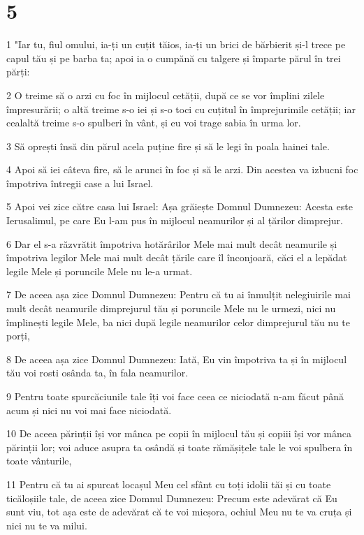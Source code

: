\chapter{5}

\par 1 "Iar tu, fiul omului, ia-ți un cuțit tăios, ia-ți un brici de bărbierit și-l trece pe capul tău și pe barba ta; apoi ia o cumpănă cu talgere și împarte părul în trei părți:
\par 2 O treime să o arzi cu foc în mijlocul cetății, după ce se vor împlini zilele împresurării; o altă treime s-o iei și s-o toci cu cuțitul în împrejurimile cetății; iar cealaltă treime s-o spulberi în vânt, și eu voi trage sabia în urma lor.
\par 3 Să oprești însă din părul acela puține fire și să le legi în poala hainei tale.
\par 4 Apoi să iei câteva fire, să le arunci în foc și să le arzi. Din acestea va izbucni foc împotriva întregii case a lui Israel.
\par 5 Apoi vei zice către casa lui Israel: Așa grăiește Domnul Dumnezeu: Acesta este Ierusalimul, pe care Eu l-am pus în mijlocul neamurilor și al țărilor dimprejur.
\par 6 Dar el s-a răzvrătit împotriva hotărârilor Mele mai mult decât neamurile și împotriva legilor Mele mai mult decât țările care îl înconjoară, căci el a lepădat legile Mele și poruncile Mele nu le-a urmat.
\par 7 De aceea așa zice Domnul Dumnezeu: Pentru că tu ai înmulțit nelegiuirile mai mult decât neamurile dimprejurul tău și poruncile Mele nu le urmezi, nici nu împlinești legile Mele, ba nici după legile neamurilor celor dimprejurul tău nu te porți,
\par 8 De aceea așa zice Domnul Dumnezeu: Iată, Eu vin împotriva ta și în mijlocul tău voi rosti osânda ta, în fala neamurilor.
\par 9 Pentru toate spurcăciunile tale îți voi face ceea ce niciodată n-am făcut până acum și nici nu voi mai face niciodată.
\par 10 De aceea părinții își vor mânca pe copii în mijlocul tău și copiii își vor mânca părinții lor; voi aduce asupra ta osândă și toate rămășițele tale le voi spulbera în toate vânturile,
\par 11 Pentru că tu ai spurcat locașul Meu cel sfânt cu toți idolii tăi și cu toate ticăloșiile tale, de aceea zice Domnul Dumnezeu: Precum este adevărat că Eu sunt viu, tot așa este de adevărat că te voi micșora, ochiul Meu nu te va cruța și nici nu te va milui.
